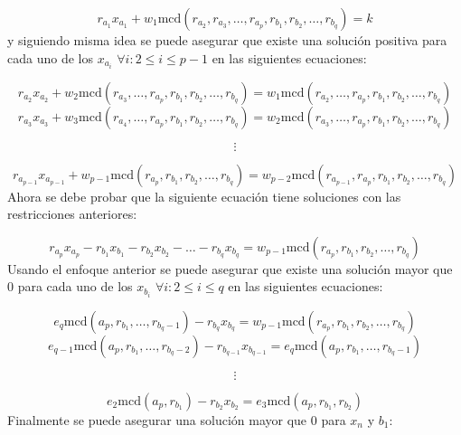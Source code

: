 \documentclass{article}
\begin{document}
\begin{equation}
    r_{a_1}x_{a_1}+w_1\text{mcd}(r_{a_2},r_{a_3},\ldots,r_{a_p},r_{b_1},r_{b_2},\ldots,r_{b_q})=k
\end{equation}
y siguiendo misma idea se puede asegurar que existe una solución positiva para cada uno de los $x_{a_i}$ $\forall i: 2\leq i\leq p-1$  en las siguientes ecuaciones:

\begin{equation}
    r_{a_2}x_{a_2}+w_2\text{mcd}(r_{a_3},\ldots,r_{a_p},r_{b_1},r_{b_2},\ldots,r_{b_q}) =w_1\text{mcd}(r_{a_2},\ldots,r_{a_p},r_{b_1},r_{b_2},\ldots,r_{b_q})
\end{equation}
\begin{equation}
    r_{a_3}x_{a_3}+w_3\text{mcd}(r_{a_4},\ldots,r_{a_p},r_{b_1},r_{b_2},\ldots,r_{b_q}) =w_2\text{mcd}(r_{a_3},\ldots,r_{a_p},r_{b_1},r_{b_2},\ldots,r_{b_q})
\end{equation}

$$\vdots $$

\begin{equation}
    r_{a_{p-1}}x_{a_{p-1}}+w_{p-1}\text{mcd}(r_{a_p},r_{b_1},r_{b_2},\ldots,r_{b_q}) =w_{p-2}\text{mcd}(r_{a_{p-1}},r_{a_p},r_{b_1},r_{b_2},\ldots,r_{b_q})
\end{equation}
Ahora se debe probar que la siguiente ecuación tiene soluciones con las restricciones anteriores:

\begin{equation}
    r_{a_p}x_{a_p}-r_{b_1}x_{b_1}-r_{b_2}x_{b_2}-\ldots -r_{b_q}x_{b_q}= w_{p-1}\text{mcd}(r_{a_p},r_{b_1},r_{b_2},\ldots,r_{b_q})
\end{equation}
Usando el enfoque anterior se puede asegurar que existe una solución mayor que 0 para cada uno de los $x_{b_i}$ $\forall i: 2\leq i\leq q$  en las siguientes ecuaciones:

\begin{equation}
    e_{q}\text{mcd}(a_p, r_{b_1},\ldots,r_{b_q-1})-r_{b_q}x_{b_q} =w_{p-1}\text{mcd}(r_{a_p},r_{b_1},r_{b_2},\ldots,r_{b_q})
\end{equation}
\begin{equation}
    e_{q-1}\text{mcd}(a_p, r_{b_1},\ldots,r_{b_q-2})-r_{b_{q-1}}x_{b_{q-1}} =e_{q}\text{mcd}(a_p, r_{b_1},\ldots,r_{b_q-1})
\end{equation}

$$\vdots $$

\begin{equation}
    e_{2}\text{mcd}(a_p, r_{b_1})-r_{b_2}x_{b_2} =e_{3}\text{mcd}(a_p, r_{b_1}, r_{b_2})
\end{equation}
Finalmente se puede asegurar una solución mayor que 0 para $x_n$ y $b_1$:
\end{document}
